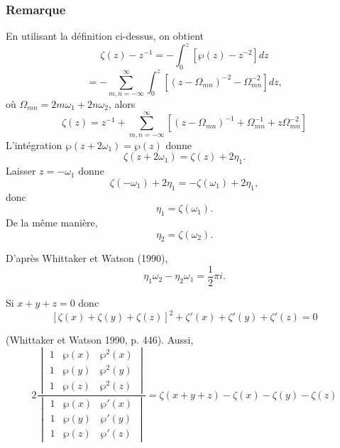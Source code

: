 \documentclass[12pt]{article}
\begin{document}
                        \newpage
                        \subsubsection{Remarque}
                        En utilisant la définition ci-dessus, on obtient
                        \[
                        \zeta (z) - z^{-1} = - \int_{0}^{z} \left[ \wp (z) - z^{-2} \right] dz \tag{3}
                        \]
                        \[
                        = - \sum_{m,n=-\infty}^{\infty} \int_{0}^{z} \left[ (z - \Omega_{mn})^{-2} - \Omega_{mn}^{-2} \right] dz, \tag{4}
                        \]
                        où $\Omega_{mn} = 2 m \omega_1 + 2 n \omega_2$, alors
                        \[
                        \zeta (z) = z^{-1} + \sum_{m,n=-\infty}^{\infty} \left[ (z - \Omega_{mn})^{-1} + \Omega_{mn}^{-1} + z \Omega_{mn}^{-2} \right] \tag{5}
                        \]
                        L'intégration $\wp (z + 2 \omega_1) = \wp (z)$ donne
                        \[
                        \zeta (z + 2 \omega_1) = \zeta (z) + 2 \eta_1. \tag{6}
                        \]
                        Laisser $z = -\omega_1$ donne
                        \[
                        \zeta (-\omega_1) + 2 \eta_1 = -\zeta (\omega_1) + 2 \eta_1, \tag{7}
                        \]
                        donc
                        \[
                        \eta_1 = \zeta (\omega_1). \tag{8}
                        \]
                        De la même manière,
                        \[
                        \eta_2 = \zeta (\omega_2). \tag{9}
                        \]

                        D'après Whittaker et Watson (1990),
                        \[
                        \eta_1 \omega_2 - \eta_2 \omega_1 = \frac{1}{2} \pi i. \tag{10}
                        \]

                        Si $x + y + z = 0$ donc
                        \[
                        \left[ \zeta (x) + \zeta (y) + \zeta (z) \right]^2 + \zeta' (x) + \zeta' (y) + \zeta' (z) = 0 \tag{11}
                        \]

                        (Whittaker et Watson 1990, p. 446). Aussi,
                        \[
                            2 \frac{\begin{vmatrix}
                                1 & \wp (x) & \wp^2 (x) \\
                                1 & \wp (y) & \wp^2 (y) \\
                                1 & \wp (z) & \wp^2 (z)
                                \end{vmatrix}}{\begin{vmatrix}
                                    1 & \wp (x) & \wp' (x) \\
                                    1 & \wp (y) & \wp' (y) \\
                                    1 & \wp (z) & \wp' (z)
                                    \end{vmatrix} }
                        = \zeta (x + y + z) - \zeta (x) - \zeta (y) - \zeta (z) \tag{12}
                        \]
\end{document}
